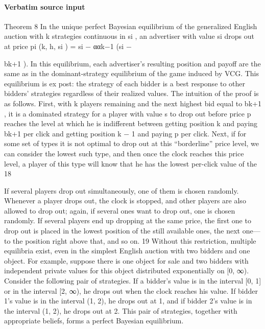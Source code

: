 \documentclass[10pt]{article}
\begin{document}
\paragraph{Verbatim source input}
\begin{ReviewVerbatim}
Theorem 8 In the unique perfect Bayesian equilibrium of the generalized English auction with
k
strategies continuous in si , an advertiser with value si drops out at price pi (k, h, si ) = si − ααk−1
(si −

bk+1 ). In this equilibrium, each advertiser’s resulting position and payoff are the same as in the
dominant-strategy equilibrium of the game induced by VCG. This equilibrium is ex post: the strategy
of each bidder is a best response to other bidders’ strategies regardless of their realized values.
The intuition of the proof is as follows. First, with k players remaining and the next highest
bid equal to bk+1 , it is a dominated strategy for a player with value s to drop out before price p
reaches the level at which he is indifferent between getting position k and paying bk+1 per click and
getting position k − 1 and paying p per click. Next, if for some set of types it is not optimal to drop
out at this “borderline” price level, we can consider the lowest such type, and then once the clock
reaches this price level, a player of this type will know that he has the lowest per-click value of the
18

If several players drop out simultaneously, one of them is chosen randomly. Whenever a player drops out, the
clock is stopped, and other players are also allowed to drop out; again, if several ones want to drop out, one is chosen
randomly. If several players end up dropping at the same price, the first one to drop out is placed in the lowest
position of the still available ones, the next one—to the position right above that, and so on.
19
Without this restriction, multiple equilibria exist, even in the simplest English auction with two bidders and
one object. For example, suppose there is one object for sale and two bidders with independent private values for
this object distributed exponentially on [0, ∞). Consider the following pair of strategies. If a bidder’s value is in
the interval [0, 1] or in the interval [2, ∞), he drops out when the clock reaches his value. If bidder 1’s value is in
the interval (1, 2), he drops out at 1, and if bidder 2’s value is in the interval (1, 2), he drops out at 2. This pair of
strategies, together with appropriate beliefs, forms a perfect Bayesian equilibrium.


\end{ReviewVerbatim}
\end{document}
